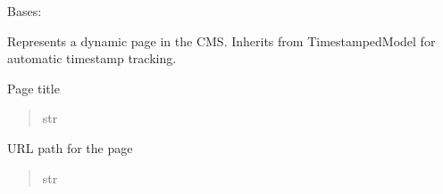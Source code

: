 \documentclass[letterpaper,10pt,english]{sphinxmanual}
\begin{document}

\begin{fulllineitems}
\label{\detokenize{pages_app.models:pages_app.models.page.Page}}
\pysigstartsignatures
\pysiglinewithargsret
{}
{\sphinxparamcomma {}}
{}
\pysigstopsignatures
\sphinxAtStartPar
Bases: {\hyperref[\detokenize{pages_app.models:pages_app.models.base.TimestampedModel}]{}}

\sphinxAtStartPar
Represents a dynamic page in the CMS.
Inherits from TimestampedModel for automatic timestamp tracking.

\begin{fulllineitems}
\label{\detokenize{pages_app.models:pages_app.models.page.Page.title}}
\pysigstartsignatures
\pysigline
{}
\pysigstopsignatures
\sphinxAtStartPar
Page title
\begin{quote}\begin{description}
\sphinxAtStartPar
str

\end{description}\end{quote}

\end{fulllineitems}


\begin{fulllineitems}
\label{\detokenize{pages_app.models:pages_app.models.page.Page.url_path}}
\pysigstartsignatures
\pysigline
{}
\pysigstopsignatures
\sphinxAtStartPar
URL path for the page
\begin{quote}\begin{description}
\sphinxAtStartPar
str

\end{description}\end{quote}


\end{fulllineitems}
\end{fulllineitems}
\end{document}
